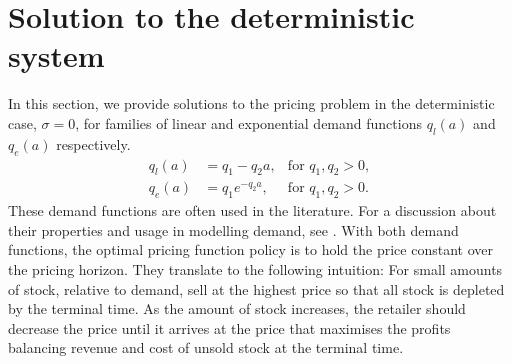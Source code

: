 \documentclass[main.tex]{subfiles}
\begin{document}
\section{Solution to the deterministic
  system}\label{sec:deterministic_hjb}
In this section, we provide solutions to the pricing problem in the
deterministic case, $\sigma = 0$, for families of linear and exponential
demand functions $q_l(a)$ and $q_e(a)$ respectively.
\begin{align}
  q_l(a)&=q_1-q_2a,&\text{for } q_1,q_2>0,\\
  q_e(a)&=q_1e^{-q_2a},&\text{for } q_1,q_2>0.
\end{align}
These demand functions are often used in the literature. For a discussion
about their properties and usage in modelling demand, see \citet[Ch.~7]{talluri2006theory}.
With both demand functions, the optimal pricing function policy is to hold the
price constant over the pricing horizon. They translate to the
following intuition: For small amounts of stock, relative to demand,
sell at the highest price so that all stock is depleted by the
terminal time. As the amount of stock increases, the retailer should
decrease the price until it arrives at the price that maximises the
profits balancing revenue and cost of unsold stock at the terminal
time.
\end{document}
